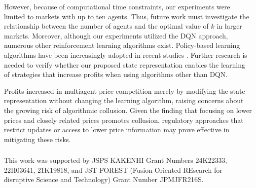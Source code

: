 \documentclass[runningheads]{llncs}
\begin{document}
However, because of computational time constraints, our experiments were limited to markets with up to ten agents. Thus, future work must investigate the relationship between the number of agents and the optimal value of $k$ in larger markets.
Moreover, although our experiments utilized the DQN approach, numerous other reinforcement learning algorithms exist.
Policy-based learning algorithms have been increasingly adopted in recent studies \cite{deng2024algorithmic,martello2022autonomous}.
Further research is needed to verify whether our proposed state representation enables the learning of strategies that increase profits when using algorithms other than DQN.

Profits increased in multiagent price competition merely by modifying the state representation without changing the learning algorithm, raising concerns about the growing risk of algorithmic collusion.
Given the finding that focusing on lower prices and closely related prices promotes collusion, regulatory approaches that restrict updates or access to lower price information may prove effective in mitigating these risks.


\begin{credits}
\subsubsection{\ackname}
This work was supported by JSPS KAKENHI Grant Numbers 24K22333, 22H03641, 21K19818, and JST FOREST (Fusion Oriented REsearch for disruptive Science and Technology) Grant Number JPMJFR216S.
\end{credits}






\end{document}
